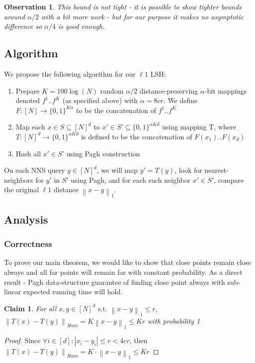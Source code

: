 \documentclass{scrartcl}
\newcommand{\zo}{\{0,1\}}
\newcommand{\st}{\text{ s.t. }}
\newtheorem{observation}[theorem]{Observation}
\newtheorem{claim}[theorem]{Claim}
\newcommand{\norm}[1]{\left\lVert#1\right\rVert}
\begin{document}
\begin{observation}
This bound is not tight - it is possible to show tighter bounds around $\alpha/2$ with a bit more work - but for our purpose it makes no asymptotic difference so $\alpha/4$ is good enough.
\end{observation}


\subsection{Algorithm}

We propose the following algorithm for our $\ell1$ LSH:
\begin{enumerate}
	\item Prepare $K=100\log(N)$ random $\alpha/2$ distance-preserving $\alpha$-bit mappings denoted $f^1..f^K$ (as specified above) with $\alpha=8cr$. We define $F : [N] \rightarrow \zo^{K\alpha}$ to be the concatenation of $f^1..f^K$
	\item Map each $x \in S \subseteq [N]^d$ to $x' \in S' \subseteq \zo^{\alpha K d}$ using mapping T, where $T : [N]^d \rightarrow \zo^{\alpha K d}$ is defined to be the concatenation of $F(x_1)..F(x_d)$
	\item Hash all $x' \in S'$ using Pagh construction
\end{enumerate}

On each NNS query $y \in [N]^d$, we will map $y'=T(y)$, look for nearest-neighbors for $y'$ in $S'$ using Pagh, and for each such neighbor $x'\in S'$, compare the original $\ell1$ distance $\norm{x-y}_1$.


\subsection{Analysis}
\subsubsection{Correctness}
To prove our main theorem, we would like to show that close points remain close always and all far points will remain far with constant probability. As a direct result - Pagh data-structure guarantee of finding close point always with sub-linear expected running time will hold.
\begin{claim}
	For all $x,y \in [N]^d \st \norm{x-y}_1 \leq r$, $\norm{T(x)-T(y)}_{Ham} = K\norm{x-y}_1 \leq Kr$ with probability 1
\end{claim}
\begin{proof}
	Since $\forall i \in [d] : |x_i-y_i|\leq r < 4cr$, then $\norm{T(x)-T(y)}_{Ham} = K\cdot \norm{x-y}_1 \leq Kr$
\end{proof}
\end{document}
